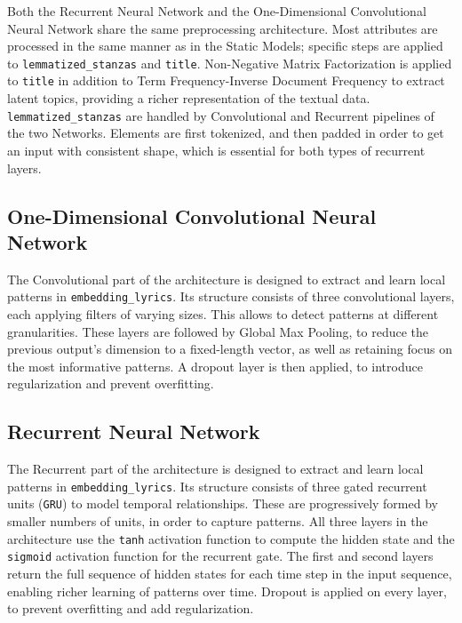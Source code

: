 
Both the Recurrent Neural Network and the One-Dimensional Convolutional
Neural Network share the same preprocessing
architecture. Most attributes are processed in the same manner as in
the Static Models; specific steps are applied to \texttt{lemmatized\_stanzas}
and \texttt{title}.
Non-Negative Matrix Factorization is applied to \texttt{title} in addition to
Term Frequency-Inverse Document Frequency
to extract latent topics, providing a richer representation of the
textual data.\\

\texttt{lemmatized\_stanzas} are handled by Convolutional and Recurrent
pipelines of the two Networks.
Elements are first tokenized, and then padded in order to
get an input with consistent shape, which is essential for both types of
recurrent layers.\\

\subsection*{One-Dimensional Convolutional Neural Network}

The Convolutional part of the architecture is designed to extract and learn
local patterns in \texttt{embedding\_lyrics}.
Its structure consists of three convolutional layers, each applying filters of
varying sizes. This allows to detect patterns at different granularities.
These layers are followed by Global Max Pooling, to reduce the previous output's
dimension to a fixed-length vector, as well as retaining focus on the most
informative patterns.
A dropout layer is then applied, to introduce regularization and prevent
overfitting.


\subsection*{Recurrent Neural Network}
The Recurrent part of the architecture is designed to extract and learn
local patterns in \texttt{embedding\_lyrics}.
Its structure consists of three gated recurrent units (\texttt{GRU})
to model temporal relationships. These are progressively formed by smaller
numbers of units, in order to capture patterns. All three layers in the
architecture use the \texttt{tanh} activation function to compute the hidden state and
the \texttt{sigmoid} activation function for the recurrent gate.
The first and second layers return the full sequence of hidden states for each
time step in the input sequence, enabling richer learning of patterns over time.
Dropout is applied on every layer, to prevent overfitting and add regularization.


